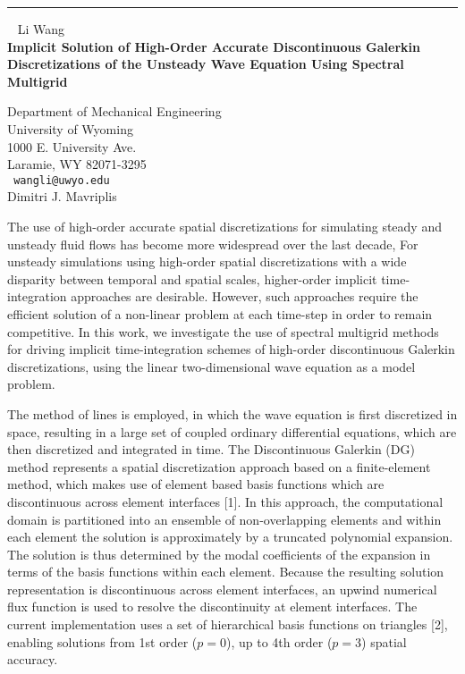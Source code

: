 \documentclass{report}
\begin{document}
\begin{center}

\rule{6in}{1pt} \
{\large
Li Wang
\\ {\bf
Implicit Solution of High-Order Accurate Discontinuous Galerkin
Discretizations of the Unsteady Wave Equation Using Spectral Multigrid
}}


Department of Mechanical Engineering \\
University of Wyoming \\
1000 E. University Ave. \\
Laramie, WY 82071-3295
\\ {\tt
wangli@uwyo.edu
}
\\
Dimitri J. Mavriplis
\end{center}

The use of high-order accurate spatial discretizations for simulating
steady and unsteady fluid flows has become more widespread over the
last decade, For unsteady simulations using high-order spatial
discretizations with a wide disparity between temporal and spatial
scales, higher-order implicit time-integration approaches are
desirable. However, such approaches require the efficient solution of a
non-linear problem at each time-step in order to remain competitive. In
this work, we investigate the use of spectral multigrid methods for
driving implicit time-integration schemes of high-order discontinuous
Galerkin discretizations, using the linear two-dimensional wave
equation as a model problem.

The method of lines is employed, in which the wave equation is first
discretized in space, resulting in a large set of coupled ordinary
differential equations, which are then discretized and integrated in
time. The Discontinuous Galerkin (DG) method represents a spatial
discretization approach based on a finite-element method, which makes
use of element based basis functions which are discontinuous across
element interfaces [1]. In this approach, the computational domain is
partitioned into an ensemble of non-overlapping elements and within
each element the solution is approximately by a truncated polynomial
expansion. The solution is thus determined by the modal coefficients of
the expansion in terms of the basis functions within each element.
Because the resulting solution representation is discontinuous across
element interfaces, an upwind numerical flux function is used to
resolve the discontinuity at element interfaces. The current
implementation uses a set of hierarchical basis functions on triangles
[2], enabling solutions from 1st order ($p=0$), up to 4th order
($p=3$) spatial accuracy.
\end{document}
